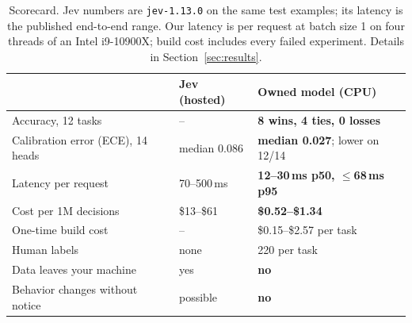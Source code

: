 \documentclass[11pt]{article}
\begin{document}
\begin{table}[t]
\centering\small
\begin{tabular}{lll}
\toprule
 & Jev (hosted) & Owned model (CPU) \\
\midrule
Accuracy, 12 tasks & -- & \textbf{8 wins, 4 ties, 0 losses} \\
Calibration error (ECE), 14 heads & median 0.086 & \textbf{median 0.027}; lower on 12/14 \\
Latency per request & 70--500\,ms & \textbf{12--30\,ms p50, $\le$68\,ms p95} \\
Cost per 1M decisions & \$13--\$61 & \textbf{\$0.52--\$1.34} \\
One-time build cost & -- & \$0.15--\$2.57 per task \\
Human labels & none & 220 per task \\
Data leaves your machine & yes & \textbf{no} \\
Behavior changes without notice & possible & \textbf{no} \\
\bottomrule
\end{tabular}
\caption{Scorecard. Jev numbers are \texttt{jev-1.13.0} on the same test examples; its latency is the published end-to-end range. Our latency is per request at batch size 1 on four threads of an Intel i9-10900X; build cost includes every failed experiment. Details in Section~\ref{sec:results}.}
\label{tab:scorecard}
\end{table}
\end{document}
